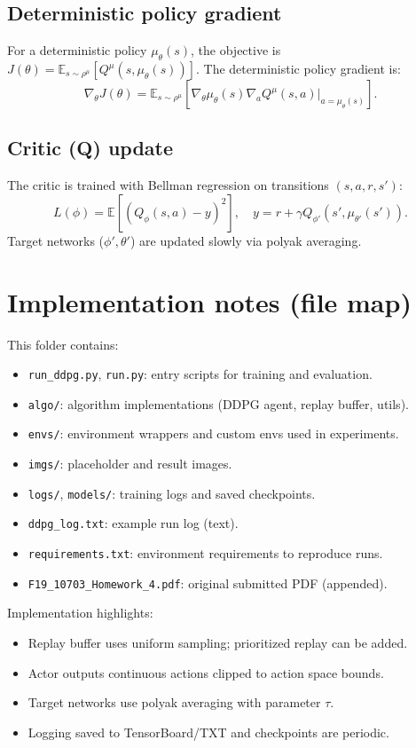 \documentclass[11pt]{article}
\begin{document}
\subsection{Deterministic policy gradient}
For a deterministic policy \(\mu_\theta(s)\), the objective is \(J(\theta)=\mathbb{E}_{s\sim\rho^\mu}[Q^{\mu}(s,\mu_\theta(s))]\). The deterministic policy gradient is:
\[
\nabla_\theta J(\theta) = \mathbb{E}_{s\sim\rho^\mu}\left[ \nabla_\theta \mu_\theta(s) \nabla_a Q^\mu(s,a)\big|_{a=\mu_\theta(s)} \right].
\]

\subsection{Critic (Q) update}
The critic is trained with Bellman regression on transitions \((s,a,r,s')\):
\[
L(\phi) = \mathbb{E}\left[(Q_\phi(s,a) - y)^2\right],\quad y = r + \gamma Q_{\phi'}(s',\mu_{\theta'}(s')).
\]
Target networks (\(\phi',\theta'\)) are updated slowly via polyak averaging.

\section{Implementation notes (file map)}
This folder contains:
\begin{itemize}
  \item \texttt{run\_ddpg.py}, \texttt{run.py}: entry scripts for training and evaluation.
  \item \texttt{algo/}: algorithm implementations (DDPG agent, replay buffer, utils).
  \item \texttt{envs/}: environment wrappers and custom envs used in experiments.
  \item \texttt{imgs/}: placeholder and result images.
  \item \texttt{logs/}, \texttt{models/}: training logs and saved checkpoints.
  \item \texttt{ddpg\_log.txt}: example run log (text).
  \item \texttt{requirements.txt}: environment requirements to reproduce runs.
  \item \texttt{F19\_10703\_Homework\_4.pdf}: original submitted PDF (appended).
\end{itemize}

Implementation highlights:
\begin{itemize}
  \item Replay buffer uses uniform sampling; prioritized replay can be added.
  \item Actor outputs continuous actions clipped to action space bounds.
  \item Target networks use polyak averaging with parameter \(\tau\).
  \item Logging saved to TensorBoard/TXT and checkpoints are periodic.
\end{itemize}
\end{document}

